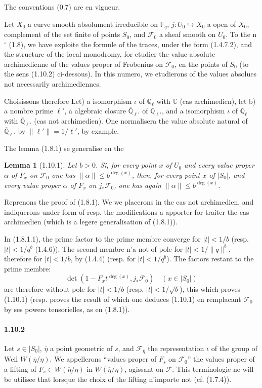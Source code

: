 \documentclass[12pt,a4paper]{article}
\theoremstyle{plain}
\newtheorem{lemma}[theorem]{Lemma}
\theoremstyle{definition}
\theoremstyle{remark}
\newcommand{\CC}{{\mathbb{C}}}
\newcommand{\FF}{{\mathbb{F}}}
\newcommand{\QQ}{{\mathbb{Q}}}
\newcommand{\QQbar}{{\overline{\QQ}}}
\begin{document}
The conventions (0.7) are en vigueur.

Let $X_0$ a curve smooth absolument irreducible on $\FF_q$, $j : U_0 \hookrightarrow X_0$ a open of $X_0$, complement of the set finite of points $S_0$, and $\mathscr{F}_0$ a sheaf smooth on $U_0$. To the n$^\circ$ (1.8), we have exploite the formule of the traces, under the form (1.4.7.2), and the structure of the local monodromy, for etudier the value absolute archimedienne of the values proper of Frobenius on $\mathscr{F}_0$, en the points of $S_0$ (to the sens (1.10.2) ci-dessous). In this numero, we etudierons of the values absolues not necessarily archimediennes.

Choisissons therefore Let) a isomorphism $\iota$ of $\QQ_\ell$ with $\CC$ (cas archimedien), let b) a nombre prime $\ell'$, a algebraic closure $\QQbar_{\ell'}$ of $\QQ_{\ell'}$, and a isomorphism $\iota$ of $\QQ_\ell$ with $\QQbar_{\ell'}$ (cas not archimedien). One normalisera the value absolute natural of $\QQbar_{\ell'}$ by $\|\ell'\| = 1/\ell'$, by example.

The lemma (1.8.1) se generalise en the

\begin{lemma}[1.10.1]
Let $b > 0$. Si, for every point $x$ of $U_0$ and every value proper $\alpha$ of $F_x$ on $\mathscr{F}_0$ one has $\|\alpha\| \leq b^{\deg(x)}$, then, for every point $x$ of $|S_0|$, and every value proper $\alpha$ of $F_x$ on $j_*\mathscr{F}_0$, one has again $\|\alpha\| \leq b^{\deg(x)}$.
\end{lemma}

Reprenons the proof of (1.8.1). We we placerons in the cas not archimedien, and indiquerons under form of resp. the modifications a apporter for traiter the cas archimedien (which is a legere generalisation of (1.8.1)).

In (1.8.1.1), the prime factor to the prime membre converge for $|t| < 1/b$ (resp. $|t| < 1/q^b$ (1.4.6)). The second membre n'a not of pole for $|t| < 1/\|q\|^b$, therefore for $|t| < 1/b$, by (1.4.4) (resp. for $|t| < 1/q^b$). The factors restant to the prime membre:
\[ \det(1 - F_x t^{\deg(x)}, j_*\mathscr{F}_0) \quad (x \in |S_0|) \]
are therefore without pole for $|t| < 1/b$ (resp. $|t| < 1/\sqrt{b}$), this which proves (1.10.1) (resp. proves the result of which one deduces (1.10.1) en remplacant $\mathscr{F}_0$ by ses powers tensorielles, as en (1.8.1)).

\paragraph{1.10.2}
Let $s \in |S_0|$, $\overline{\eta}$ a point geometric of $s$, and $\mathscr{F}_{\overline{\eta}}$ the representation $\iota$ of the group of Weil $W(\overline{\eta}/\eta)$. We appellerons ``values proper of $F_s$ on $\mathscr{F}_0$'' the values proper of a lifting of $F_s \in W(\overline{\eta}/\eta)$ in $W(\overline{\eta}/\eta)$, agissant on $\mathscr{F}$. This terminologie ne will be utilisee that lorsque the choix of the lifting n'importe not (cf. (1.7.4)).
\end{document}
